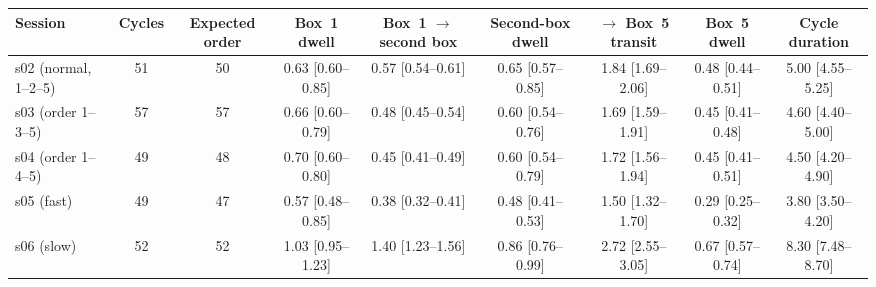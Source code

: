 \begin{tabular}{@{}lcccccccc@{}}
\toprule
Session & Cycles & Expected order & Box~1 dwell & Box~1 $\to$ second box & Second-box dwell & $\to$ Box~5 transit & Box~5 dwell & Cycle duration \\
\midrule
s02 (normal, 1--2--5) & 51 & 50 & 0.63 [0.60--0.85] & 0.57 [0.54--0.61] & 0.65 [0.57--0.85] & 1.84 [1.69--2.06] & 0.48 [0.44--0.51] & 5.00 [4.55--5.25] \\ %
s03 (order 1--3--5) & 57 & 57 & 0.66 [0.60--0.79] & 0.48 [0.45--0.54] & 0.60 [0.54--0.76] & 1.69 [1.59--1.91] & 0.45 [0.41--0.48] & 4.60 [4.40--5.00] \\ %
s04 (order 1--4--5) & 49 & 48 & 0.70 [0.60--0.80] & 0.45 [0.41--0.49] & 0.60 [0.54--0.79] & 1.72 [1.56--1.94] & 0.45 [0.41--0.51] & 4.50 [4.20--4.90] \\ %
s05 (fast) & 49 & 47 & 0.57 [0.48--0.85] & 0.38 [0.32--0.41] & 0.48 [0.41--0.53] & 1.50 [1.32--1.70] & 0.29 [0.25--0.32] & 3.80 [3.50--4.20] \\ %
s06 (slow) & 52 & 52 & 1.03 [0.95--1.23] & 1.40 [1.23--1.56] & 0.86 [0.76--0.99] & 2.72 [2.55--3.05] & 0.67 [0.57--0.74] & 8.30 [7.48--8.70] \\ %
\bottomrule
\end{tabular}
